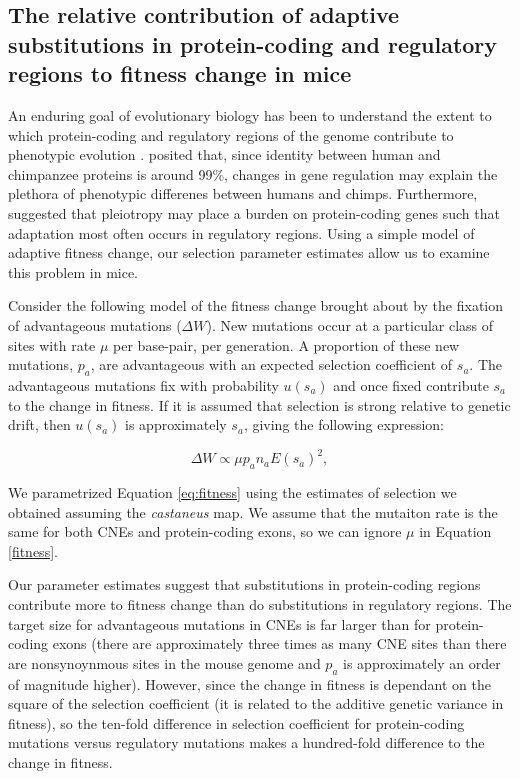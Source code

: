 \documentclass[11pt]{article}
\begin{document}
\subsection*{The relative contribution of adaptive substitutions in protein-coding and regulatory regions to fitness change in mice}

An enduring goal of evolutionary biology has been to understand the extent to which protein-coding and regulatory regions of the genome contribute to phenotypic evolution \citep{RN347, RN346}. \cite{RN347} posited that, since identity between human and chimpanzee proteins is around 99\%, changes in gene regulation may explain the plethora of phenotypic differenes between humans and chimps. Furthermore, \cite{RN346} suggested that pleiotropy may place a burden on protein-coding genes such that adaptation most often occurs in regulatory regions. Using a simple model of adaptive fitness change, our selection parameter estimates allow us to examine this problem in mice.

Consider the following model of the fitness change brought about by the fixation of advantageous mutations ($\Delta W$). New mutations occur at a particular class of sites with rate $\mu$ per base-pair, per generation. A proportion of these new mutations, $p_a$, are advantageous with an expected selection coefficient of $s_a$. The advantageous mutations fix with probability $u(s_a)$ and once fixed contribute $s_a$ to the change in fitness. If it is assumed that selection is strong relative to genetic drift, then $u(s_a)$ is approximately $s_a$, giving the following expression:

\begin{equation}
\label{eq:fitness}
\Delta W \propto \mu p_a n_a E(s_a)^2,
\end{equation}

We parametrized Equation \ref{eq:fitness} using the estimates of selection we obtained assuming the \textit{castaneus} map. We assume that the mutaiton rate is the same for both CNEs and protein-coding exons, so we can ignore $\mu$ in Equation \ref{fitness}. 

	Our parameter estimates suggest that substitutions in protein-coding regions contribute more to fitness change than do substitutions in regulatory regions. The target size for advantageous mutations in CNEs is far larger than for protein-coding exons (there are approximately three times as many CNE sites than there are nonsynoynmous sites in the mouse genome and $p_a$ is approximately an order of magnitude higher). However, since the change in fitness is dependant on the square of the selection coefficient (it is related to the additive genetic variance in fitness), so the ten-fold difference in selection coefficient for protein-coding mutations versus regulatory mutations makes a hundred-fold difference to the change in fitness.
	
\end{document}
